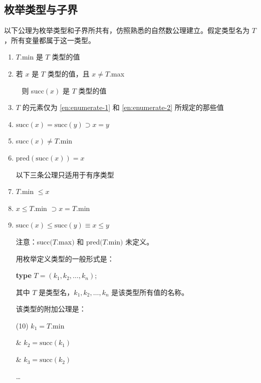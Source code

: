 \subsection{枚举类型与子界}

以下公理为枚举类型和子界所共有，仿照熟悉的自然数公理建立。假定类型名为 $T$，所有变量都属于这一类型。

\begin{enumerate}[wide, nosep, label=(\arabic*)]
	\item \label{en:enumerate-1}
	$T$.min 是 $T$ 类型的值
	
	\item \label{en:enumerate-2}
	若 $x$ 是 $T$ 类型的值，且 $x\neq T$.max

	\qquad~ 则 succ$(x)$ 是 $T$ 类型的值

	\item $T$ 的元素仅为 \ref{en:enumerate-1} 和 \ref{en:enumerate-2} 所规定的那些值

	\item $\text{succ}(x) = \text{succ}(y) \supset x = y$

	\item succ$(x) \neq T$.min

	\item $\text{pred}(\text{succ}(x)) = x$

	\noindent
	以下三条公理只适用于有序类型

	\setcounter{enumi}{6}
	\item $T$.min $\leqslant x$

	\item $x \leqslant T$.min $\supset x = T$.min

	\item \label{en:enumerate-9}
	$\text{succ}(x) \leqslant \text{succ}(y) \equiv x \leqslant y$

	\noindent
	注意：succ$(T$.max$)$ 和 pred$(T$.min$)$ 未定义。

	用枚举定义类型的一般形式是：

	\quad \textbf{type} $T = (k_1, k_2, \dots, k_n)$;

	\noindent
	其中 $T$ 是类型名，$k_1, k_2 , \dots, k_n$ 是该类型所有值的名称。
	
	该类型的附加公理是：
	
	\tabto*{.9em}(10) $k_1 = T$.min
	
	\tabto*{1.8em}\& $k_2 = \text{succ}(k_1)$
	
	\tabto*{1.8em}\& $k_3 = \text{succ}(k_2)$
	
	\tabto*{3.8em}\dots
	

\end{enumerate}
